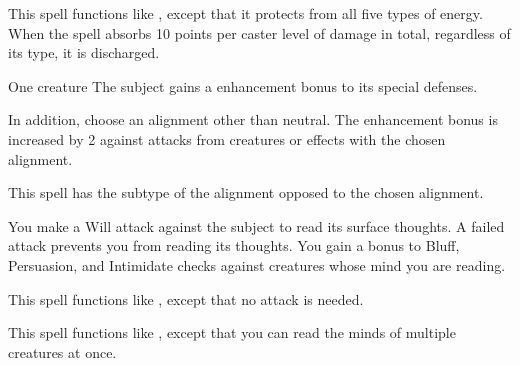 \spelleffect This spell functions like , except that it protects from all five types of energy. When the spell absorbs 10 points per caster level of damage in total, regardless of its type, it is discharged.

\spellrng{\rngclose}
\spelldur{\durshort \dismissable}
\begin{spelltarget}{One creature}
    \spelleffect The subject gains a  enhancement bonus to its special defenses. \spellbonusscalingdescription

    In addition, choose an alignment other than neutral. The enhancement bonus is increased by 2 against attacks from creatures or effects with the chosen alignment.
\end{spelltarget}
\spellnotes This spell has the subtype of the alignment opposed to the chosen alignment.

\begin{comment}
\subsubsection{Q-R}
\end{comment}

\spelleffect You make a Will attack against the subject to read its surface thoughts. A failed attack prevents you from reading its thoughts. You gain a  bonus to Bluff, Persuasion, and Intimidate checks against creatures whose mind you are reading.

\spelleffect This spell functions like , except that no attack is needed.

\spelleffect This spell functions like , except that you can read the minds of multiple creatures at once. 

